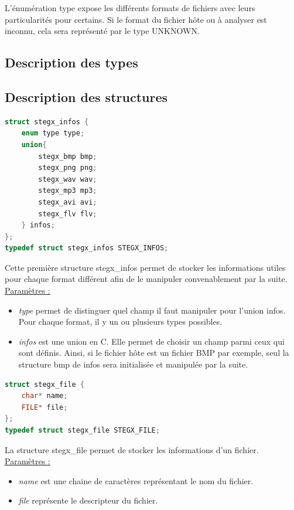 \documentclass[11pt]{article}
\begin{document}
L'énumération type expose les différents formats de fichiers avec leurs 
particularités pour certains. Si le format du fichier hôte ou à analyser 
est inconnu, cela sera représenté par le type UNKNOWN. 

\subsection{Description des types}

\subsection{Description des structures}

\begin{lstlisting}[language=c]
struct stegx_infos {
    enum type type;
    union{
        stegx_bmp bmp;
        stegx_png png;
        stegx_wav wav;
        stegx_mp3 mp3;
        stegx_avi avi;
        stegx_flv flv;
    } infos;
};
typedef struct stegx_infos STEGX_INFOS;
\end{lstlisting}

Cette première structure stegx\_infos permet de stocker les informations 
utiles pour chaque format différent afin de le manipuler convenablement 
par la suite. 
\newline
\underline{Paramètres :}
\begin{itemize}
\item \textit{type} permet de distinguer quel champ il faut manipuler pour l'union 
infos. Pour chaque format, il y un ou plusieurs types possibles.
\item \textit{infos} est une union en C. Elle permet de choisir un champ parmi
ceux qui sont définis. Ainsi, si le fichier hôte est un fichier BMP par exemple, 
seul la structure bmp de infos sera initialisée et manipulée par la suite.
\newline
\end{itemize}

\begin{lstlisting}[language=c]
struct stegx_file {
    char* name;
    FILE* file;
};
typedef struct stegx_file STEGX_FILE;
\end{lstlisting}

La structure stegx\_file permet de stocker les informations d'un fichier. 
\newline
\underline{Paramètres :}
\begin{itemize}
\item \textit{name} est une chaine de caractères représentant le nom du fichier. 
\item \textit{file} représente le descripteur du fichier. \newline
\end{itemize}
\end{document}
